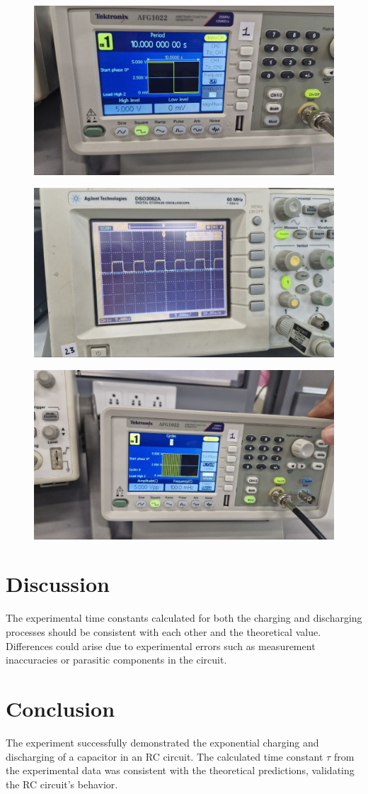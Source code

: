 \documentclass[a4paper,12pt]{article}
\begin{document}
\begin{figure}[h!]
   \centering
   \includegraphics[width=0.7\linewidth]{fig/Figure_12.jpg}
\end{figure}
\begin{figure}[h!]
   \centering
   \includegraphics[width=0.7\linewidth]{fig/Figure_13.jpg}
\end{figure}
\begin{figure}[h!]
   \centering
   \includegraphics[width=0.7\linewidth]{fig/Figure_14.jpg}
\end{figure}
\section*{\color{myblue}Discussion}
The experimental time constants calculated for both the charging and discharging processes should be consistent with each other and the theoretical value. Differences could arise due to experimental errors such as measurement inaccuracies or parasitic components in the circuit.

\section*{\color{myblue}Conclusion}
The experiment successfully demonstrated the exponential charging and discharging of a capacitor in an RC circuit. The calculated time constant \( \tau \) from the experimental data was consistent with the theoretical predictions, validating the RC circuit's behavior.
\end{document}
